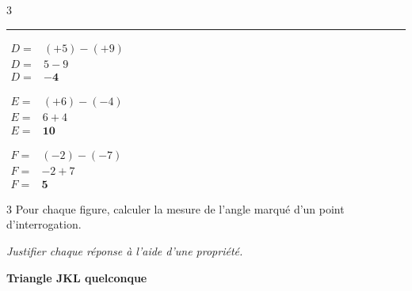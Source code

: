 \documentclass[a4paper]{book}
\begin{document}
{\begin{exerciceNote}{3}
        \vspace{0.8cm}
        \hrule
        \vspace{0.8cm}
        
        \begin{minipage}{0.3\linewidth}
            $\begin{array}{ll}
                D = & (+5) - (+9) \\[1ex]
                D = & 5 - 9 \\[1ex]
                D = & \mathbf{-4}
            \end{array}$
        \end{minipage}
        \hfill \vline \hfill
        \begin{minipage}{0.33\linewidth}
            $\begin{array}{ll}
                E = & (+6) - (-4) \\[1ex]
                E = & 6 + 4 \\[1ex]
                E = & \mathbf{10}
            \end{array}$
        \end{minipage}
        \hfill \vline \hfill
        \begin{minipage}{0.3\linewidth}
            $\begin{array}{ll}
                F = & (-2) - (-7) \\[1ex]
                F = & -2 + 7 \\[1ex]
                F = & \mathbf{5}
            \end{array}$
        \end{minipage}
    \end{exerciceNote}
    

\newpage


    \begin{exerciceNote}{3}
        Pour chaque figure, calculer la mesure de l'angle marqué d'un point d'interrogation. 
        
        \textit{Justifier chaque réponse à l'aide d'une propriété.}

        \begin{minipage}{0.32\linewidth}
             \begin{center}
                \textbf{Triangle JKL quelconque} 
                
            \end{center}


\end{minipage}
\end{exerciceNote}}
\end{document}
